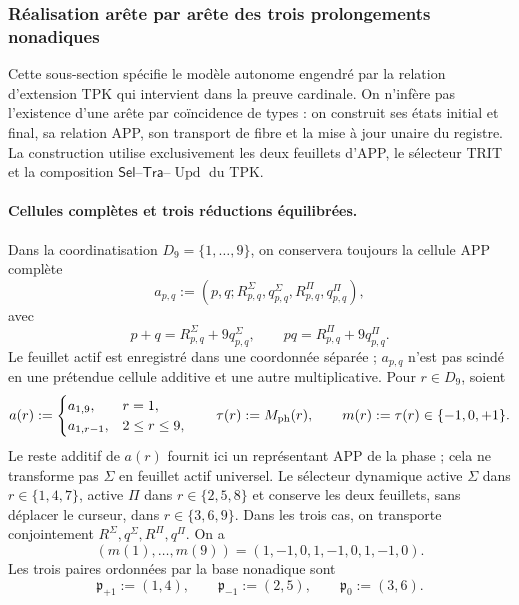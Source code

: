 \subsubsection{Réalisation arête par arête des trois prolongements nonadiques}
\label{subsubsec:tres-vueltas-ext-ch}

Cette sous-section spécifie le modèle autonome engendré par la relation
d’extension TPK qui intervient dans la preuve cardinale. On n’infère pas l’existence
d’une arête par coïncidence de types : on construit ses états initial et final,
sa relation APP, son transport de fibre et la mise à jour unaire du registre.
La construction utilise exclusivement les deux feuillets d’APP, le sélecteur TRIT
et la composition \(\mathsf{Sel}\)--\(\mathsf{Tra}\)--\(\operatorname{Upd}\) du TPK.

\paragraph{Cellules complètes et trois réductions équilibrées.}
Dans la coordinatisation \(D_9=\{1,\ldots,9\}\), on conservera toujours la cellule APP complète
\[
 a_{p,q}:=(p,q;R^\Sigma_{p,q},q^\Sigma_{p,q},
                 R^\Pi_{p,q},q^\Pi_{p,q}),
\]
avec
\[
 p+q=R^\Sigma_{p,q}+9q^\Sigma_{p,q},\qquad
 pq=R^\Pi_{p,q}+9q^\Pi_{p,q}.
\]
Le feuillet actif est enregistré dans une coordonnée séparée ; \(a_{p,q}\) n'est pas scindé en une prétendue cellule additive et une autre multiplicative. Pour \(r\in D_9\), soient
\begin{equation}
 a(r):=
 \begin{cases}
  a_{1,9},&r=1,\\
  a_{1,r-1},&2\le r\le9,
 \end{cases}
 \qquad
 \tau(r):=M_{\rm ph}(r),
 \qquad
 m(r):=\tau(r)\in\{-1,0,+1\}.
 \label{eq:celula-completa-fase-ch}
\end{equation}
Le reste additif de \(a(r)\) fournit ici un représentant APP de la
phase ; cela ne transforme pas \(\Sigma\) en feuillet actif universel. Le sélecteur
dynamique active \(\Sigma\) dans \(r\in\{1,4,7\}\), active \(\Pi\) dans
\(r\in\{2,5,8\}\) et conserve les deux feuillets, sans déplacer le curseur, dans
\(r\in\{3,6,9\}\). Dans les trois cas, on transporte conjointement
\(R^\Sigma,q^\Sigma,R^\Pi,q^\Pi\). On a
\[
 (m(1),\ldots,m(9))=(1,-1,0,1,-1,0,1,-1,0).
\]
Les trois paires ordonnées par la base nonadique sont
\begin{equation}
 \mathfrak p_{+1}:=(1,4),\qquad
 \mathfrak p_{-1}:=(2,5),\qquad
 \mathfrak p_{0}:=(3,6).
 \label{eq:tres-pares-internos-ch}
\end{equation}
